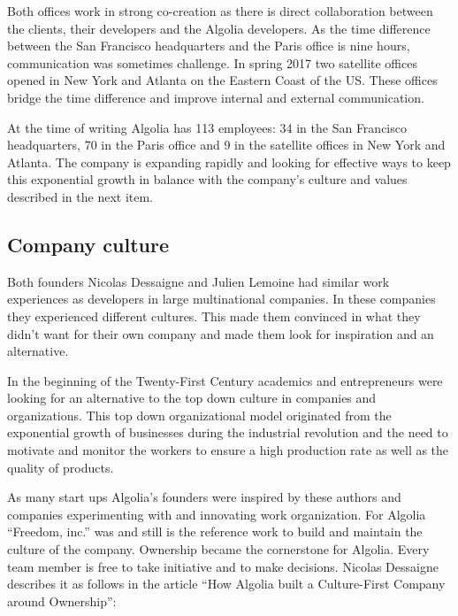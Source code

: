 Both offices work in strong co-creation as there is direct collaboration between the clients, their developers and the Algolia developers. As the time difference between the San Francisco headquarters and the Paris office is nine hours, communication was sometimes challenge. In spring 2017 two satellite offices opened in New York and Atlanta on the Eastern Coast of the US. These offices bridge the time difference and improve internal and external communication.

At the time of writing Algolia has 113 employees: 34 in the San Francisco headquarters, 70 in the Paris office and 9 in the satellite offices in New York and Atlanta. The company is expanding rapidly and looking for effective ways to keep this exponential growth in balance with the company’s culture and values described in the next item.

\subsection{Company culture}
\label{sub:company_culture}

Both founders Nicolas Dessaigne and Julien Lemoine had similar work experiences as developers in large multinational companies. In these companies they experienced different cultures. This made them convinced in what they didn't want for their own company and made them look for inspiration and an alternative.

In the beginning of the Twenty-First Century academics and entrepreneurs were looking for an alternative to the top down culture in companies and organizations. This top down organizational model originated from the exponential growth of businesses during the industrial revolution and the need to motivate and monitor the workers to ensure a high production rate as well as the quality of products.


As many start ups Algolia’s founders were inspired by these authors and companies experimenting with and innovating work organization. For Algolia ``Freedom, inc.''\cite{freedom-inc} was and still is the reference work to build and maintain the culture of the company. Ownership became the cornerstone for Algolia. Every team member is free to take initiative and to make decisions. Nicolas Dessaigne describes it as follows in the article ``How Algolia built a Culture-First Company around Ownership'':

